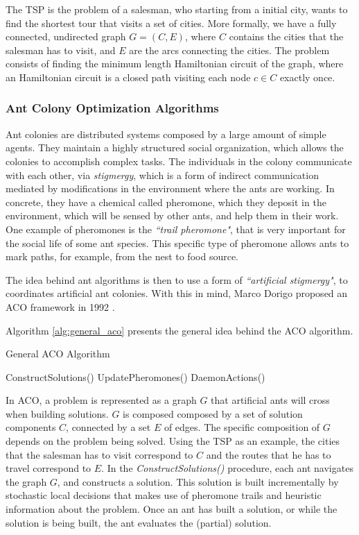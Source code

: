 		The TSP is the problem of a salesman, who starting from a initial city, wants to find the shortest tour that visits a set of cities. More formally, we have a fully connected, undirected graph $G=(C,E)$, where $C$ contains the cities that the salesman has to visit, and $E$ are the arcs connecting the cities. The problem consists of finding the minimum length Hamiltonian circuit of the graph, where an Hamiltonian circuit is a closed path visiting each node $c \in C$ exactly once.
		\subsubsection*{Ant Colony Optimization Algorithms}
		\label{subsubsec:ant_algorithms}

		Ant colonies are distributed systems \cite{acobook} composed by a large amount of simple agents. They maintain a highly structured social organization, which allows the colonies to accomplish complex tasks. The individuals in the colony communicate with each other, via \emph{stigmergy}, which is a form of indirect communication mediated by modifications in the environment where the ants are working. In concrete, they have a chemical called pheromone, which they deposit in the environment, which will be sensed by other ants, and help them in their work. One example of pheromones is the \emph{``trail pheromone"}, that is very important for the social life of some ant species. This specific type of pheromone allows ants to mark paths, for example, from the nest to food source.
	
		The idea behind ant algorithms is then to use a form of \emph{``artificial stigmergy"}, to coordinates artificial ant colonies. With this in mind, Marco Dorigo proposed an ACO framework in 1992 \cite{dorigo92}. 	

		Algorithm \ref{alg:general_aco} presents the general idea behind the ACO algorithm.
				\begin{algorithm}
					\caption{General ACO Algorithm}
					\label{alg:general_aco}
					\begin{algorithmic}
						\STATE ConstructSolutions()
						\STATE UpdatePheromones() 
						\STATE DaemonActions() 
					\ENDWHILE
					\end{algorithmic}
				\end{algorithm}
				
				In ACO, a problem is represented as a graph $G$ that artificial ants will cross when building solutions. $G$ is composed composed by a set of solution components $C$, connected by a set $E$ of edges. The specific composition of $G$ depends on the problem being solved.
				 Using the TSP as an example, the cities that the salesman has to visit correspond to $C$ and the routes that he has to travel correspond to $E$.			
				In the \emph{ConstructSolutions()} procedure, each ant navigates the graph $G$, and constructs a solution. This solution is built incrementally by stochastic local decisions that makes use of pheromone trails and heuristic information about the problem. Once an ant has built a solution, or while the solution is being built, the ant evaluates the (partial) solution.
				
